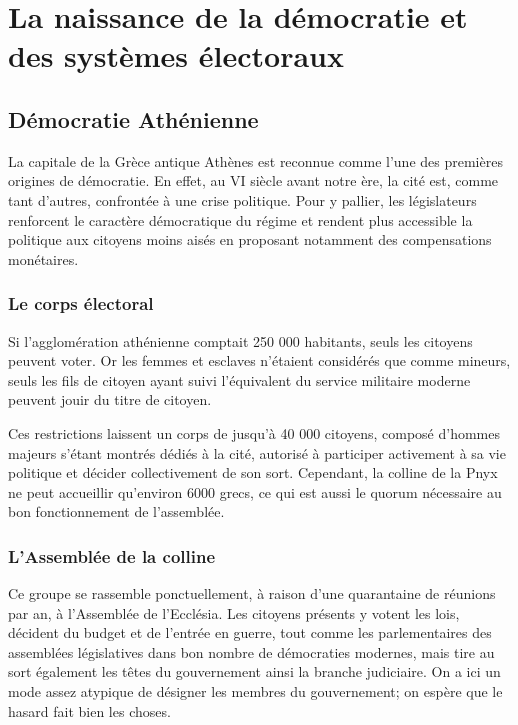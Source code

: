 \documentclass[12pt,a4paper]{report}
\begin{document}
\chapter{La naissance de la démocratie et des systèmes électoraux}

\section{Démocratie Athénienne}
La capitale de la Grèce antique Athènes est reconnue comme l'une des premières origines de démocratie. 
En effet, au VI siècle avant notre ère, la cité est, comme tant d'autres, confrontée à une crise politique. 
Pour y pallier, les législateurs renforcent le caractère démocratique du régime et rendent plus accessible la politique aux citoyens moins aisés en proposant notamment des compensations monétaires.

\subsection{Le corps électoral}
Si l'agglomération athénienne comptait 250 000 habitants\nocite{persee:popu}, seuls les citoyens peuvent voter. 
Or les femmes et esclaves n'étaient considérés que comme mineurs, seuls les fils de citoyen ayant suivi l'équivalent du service militaire moderne peuvent jouir du titre de citoyen.

Ces restrictions laissent un corps de jusqu'à 40 000 citoyens, composé d'hommes majeurs s'étant montrés dédiés à la cité, autorisé à participer activement à sa vie politique et décider collectivement de son sort. 
Cependant, la colline de la Pnyx ne peut accueillir qu'environ 6000 grecs, ce qui est aussi le quorum nécessaire au bon fonctionnement de l'assemblée. \nocite{wiki:pnyx}

\subsection{L'Assemblée de la colline}
Ce groupe se rassemble ponctuellement, à raison d'une quarantaine de réunions par an, à l'Assemblée de l'Ecclésia. \nocite{wiki:ecclesia}
Les citoyens présents y votent les lois, décident du budget et de l'entrée en guerre, tout comme les parlementaires des assemblées législatives dans bon nombre de démocraties modernes, mais tire au sort également les têtes du gouvernement ainsi la branche judiciaire. \nocite{wiki:heliastes}
On a ici un mode assez atypique de désigner les membres du gouvernement; on espère que le hasard fait bien les choses.
\end{document}
